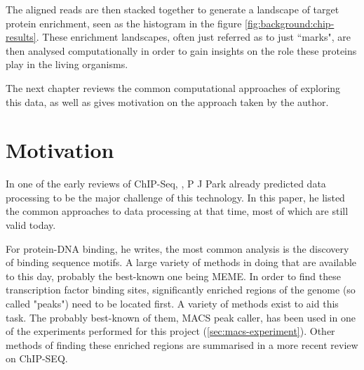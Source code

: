 \documentclass[parskip]{cs4rep}
\begin{document}
The aligned reads are then stacked together to generate a landscape of target protein enrichment, seen as the histogram in the figure \ref{fig:background:chip-results}. These enrichment landscapes, often just referred as to just ``marks", are then analysed computationally in order to gain insights on the role these proteins play in the living organisms.
 
The next chapter reviews the common computational approaches of exploring this data, as well as gives motivation on the approach taken by the author.

\chapter{Motivation}

In one of the early reviews of ChIP-Seq, \cite{Park:2009wc}, P J Park already predicted data processing to be the major challenge of this technology. In this paper, he listed the common approaches to data processing at that time, most of which are still valid today.

For protein-DNA binding, he writes, the most common analysis is the discovery of binding sequence motifs. A large variety of methods in doing that are available to this day, probably the best-known one being MEME\cite{Grundy:1997vb}. In order to find these transcription factor binding sites, significantly enriched regions of the genome (so called "peaks") need to be located first. A variety of methods exist to aid this task. The probably best-known of them, MACS peak caller\cite{Zhang:2008wp}, has been used in one of the experiments performed for this project (\autoref{sec:macs-experiment}). Other methods of finding these enriched regions are summarised in a more recent review on ChIP-SEQ\cite{Furey:2012ha}.
\end{document}

